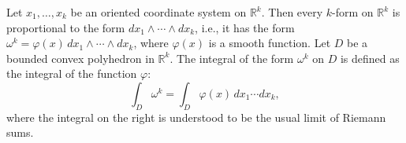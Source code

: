 Let $x_1, \ldots, x_k$ be an oriented coordinate system on $\mathbb{R}^k$. Then every $k$-form on $\mathbb{R}^k$ is proportional to the form $dx_1 \wedge \cdots \wedge dx_k$, i.e., it has the form $\omega^k = \varphi(x)\,dx_1 \wedge \cdots \wedge dx_k$, where $\varphi(x)$ is a smooth function. Let $D$ be a bounded convex polyhedron in $\mathbb{R}^k$. The integral of the form $\omega^k$ on $D$ is defined as the integral of the function $\varphi$:
$$\int_D \omega^k = \int_D \varphi(x)\,dx_1 \cdots dx_k,$$
where the integral on the right is understood to be the usual limit of Riemann sums.
